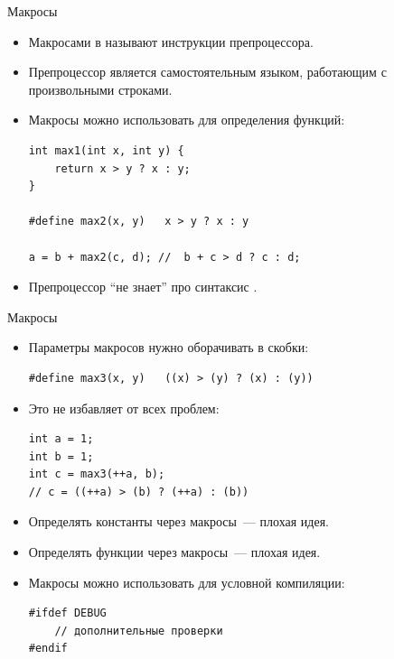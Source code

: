 \documentclass[aspectration=1610,t]{beamer}
\begin{document}
\begin{frame}[fragile]{Макросы}
    \begin{itemize}
        \item Макросами в \langcpp называют инструкции препроцессора.
        \item Препроцессор \langcpp является самостоятельным языком,
            работающим с произвольными строками.
        \item Макросы можно использовать для определения функций:
            \begin{lstlisting}
int max1(int x, int y) { 
    return x > y ? x : y;
}

#define max2(x, y)   x > y ? x : y

a = b + max2(c, d); //  b + c > d ? c : d;
            \end{lstlisting}
        \item Препроцессор ``не знает'' про синтаксис \langcpp.
    \end{itemize}
\end{frame}
    
\begin{frame}[fragile]{Макросы}
    \begin{itemize}
        \item Параметры макросов нужно оборачивать в скобки:
            \begin{lstlisting}
#define max3(x, y)   ((x) > (y) ? (x) : (y))
            \end{lstlisting}
        \item Это не избавляет от всех проблем:
            \begin{lstlisting}
int a = 1;
int b = 1;
int c = max3(++a, b); 
// c = ((++a) > (b) ? (++a) : (b))
            \end{lstlisting}
        \item Определять константы через макросы~--- плохая идея.
        \item Определять функции через макросы~--- плохая идея.
        \item Макросы можно использовать для условной компиляции:
            \begin{lstlisting}
#ifdef DEBUG
    // дополнительные проверки
#endif
            \end{lstlisting}
    \end{itemize}
\end{frame}
\end{document}
